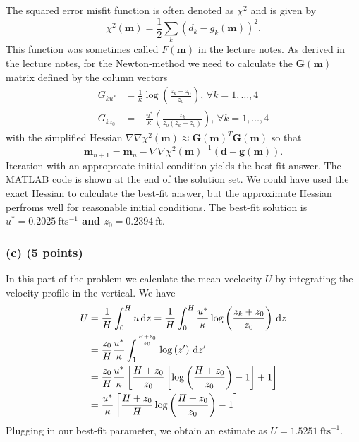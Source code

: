 \documentclass[11pt]{article}
\begin{document}
The squared error misfit function is often denoted as $\chi^2$ and is given by
\begin{equation}
\chi^2(\mathbf{m}) = \frac{1}{2}\sum_{k}\left(d_k - g_k(\mathbf{m})\right)^2.
\end{equation}
This function was sometimes called $F(\mathbf{m})$ in the lecture notes.
As derived in the lecture notes, for the Newton-method we need to calculate the $\mathbf{G}(\mathbf{m})$ matrix defined by the column vectors
\begin{subequations}
\begin{align}
G_{ku^*} &= \frac{1}{\kappa}\log\left(\frac{z_k + z_0}{z_0}\right),\, \forall k = 1, \hdots, 4\\
G_{kz_0} &= -\frac{u^*}{\kappa} \left( \frac{z_k}{z_0(z_k + z_0)} \right),\, \forall k = 1, \hdots, 4
\end{align}
\end{subequations}
with the simplified Hessian $\nabla \nabla \chi^2 (\mathbf{m}) \approx \mathbf{G}(\mathbf{m})^T\mathbf{G}(\mathbf{m})$ so that
\begin{equation}
\mathbf{m}_{n+1} = \mathbf{m}_n - \nabla \nabla \chi^2(\mathbf{m})^{-1} \left(\mathbf{d} -\mathbf{g}(\mathbf{m}) \right).
\end{equation}
Iteration with an approproate initial condition yields the best-fit answer. The MATLAB code is shown at the end of the solution set. We could have used the exact Hessian to calculate the best-fit answer, but the approximate Hessian perfroms well for reasonable initial conditions. The best-fit solution is \textbf{$u^* = 0.2025~\mathrm{ft s^{-1}}$ and $z_0 = 0.2394  ~\mathrm{ft}$}.

\subsubsection*{(c) (5 points)}

In this part of the problem we calculate the mean veclocity $U$ by integrating the velocity profile in the vertical. We have
\begin{subequations}
\begin{align}
U &= \frac{1}{H} \int_0^H u \, \text{d}z = \frac{1}{H} \int_0^H \frac{u^*}{\kappa} \log \left( \frac{z_k+z_0}{z_0} \right) \, \text{d}z\\
&= \frac{z_0}{H} \frac{u^*}{\kappa}\int_1^{\frac{H+z_0}{z_0}} \log \left( z' \right) \, \text{d}z'\\
&= \frac{z_0}{H} \frac{u^*}{\kappa} \left[\frac{H+z_0}{z_0} \left[\log\left(\frac{H+z_0}{z_0} \right)-1\right]+1\right]\\
&= \frac{u^*}{\kappa} \left[\frac{H+z_0}{H} \log\left(\frac{H+z_0}{z_0} \right)-1\right]
\end{align}
\end{subequations}
Plugging in our best-fit parameter, we obtain an estimate as \textbf{$U = 1.5251~\mathrm{ft s^{-1}}$}. 
\end{document}
